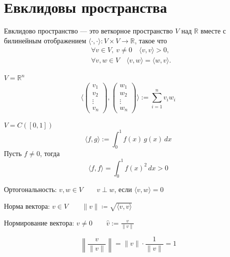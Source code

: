 \section{Евклидовы пространства}

\begin{definition}
    Евклидово пространство --- это веткорное пространство $V$ над $\mathbb{R}$
    вместе с билинейным отображением $\langle\cdot,\cdot\rangle \colon V \times V  \to \mathbb{R}$,
    такое что 
    \[
    \begin{aligned}
        &\forall v \in V, \ v \ne 0 \quad \langle v,v\rangle > 0, \\
        &\forall v, w \in V \quad \langle v, w\rangle = \langle w, v\rangle.
    \end{aligned}
    \]
\end{definition}

\begin{examplelist}
        \item $V = \mathbb{R}^n$
            \[
            \langle
            \begin{pmatrix} v_1 \\ v_2 \\ \vdots \\ v_n \end{pmatrix},
            \begin{pmatrix} w_1 \\ w_2 \\ \vdots \\ w_n \end{pmatrix}
            \rangle
            := \sum_{i=1}^{n} v_i w_i
            \]
        \item $V = C([0,1])$
            \[
            \langle f, g\rangle := \int_0^1 f(x)\, g(x)\, dx
            \]
            Пусть $f \neq 0$, тогда
            \[
            \langle f, f\rangle = \int_0^1 f(x)^2\, dx > 0
            \]
\end{examplelist}


\begin{definition}
    Ортогональность:
    $v, w \in V \qquad v \perp w$, если $\langle v,w\rangle = 0$
\end{definition}

\begin{definition}
    Норма вектора:
    $v \in V \qquad \lVert v \rVert \coloneqq \sqrt{\langle v, v \rangle}$
\end{definition}

\begin{definition}
    Нормирование вектора:
    $v \neq 0 \qquad \hat{v} := \frac{v}{\|v\|}$

    \[
        \left\lVert \frac{v}{\|v\|} \right\rVert
        = \|v\| \cdot
        \frac{1}{\|v\|} = 1
    \]
\end{definition}


